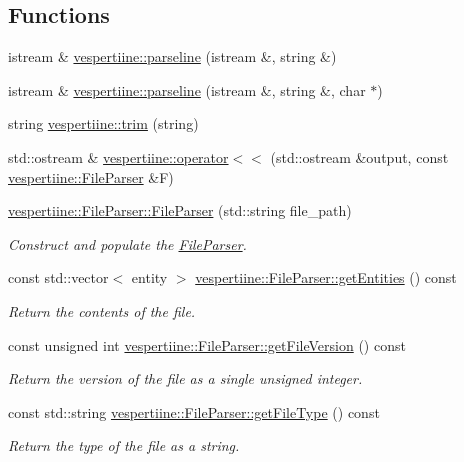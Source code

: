 \subsection*{Functions}
\begin{DoxyCompactItemize}
\item 
istream \& \hyperlink{group__vespertiine_ga45bab8eea6e760c36a785c145af6ba25}{vespertiine\+::parseline} (istream \&, string \&)
\item 
istream \& \hyperlink{group__vespertiine_ga05687b76bc32ebfb4d97d92c417acaf6}{vespertiine\+::parseline} (istream \&, string \&, char $\ast$)
\item 
string \hyperlink{group__vespertiine_ga5541b037e75ed830f526c2e073b26474}{vespertiine\+::trim} (string)
\item 
std\+::ostream \& \hyperlink{group__vespertiine_ga1ca507e4b8f52201ba9cccaaf496e9be}{vespertiine\+::operator$<$$<$} (std\+::ostream \&output, const \hyperlink{classvespertiine_1_1FileParser}{vespertiine\+::\+File\+Parser} \&F)
\item 
\hyperlink{group__vespertiine_ga01e372573c11d4c2848419c8842d583e}{vespertiine\+::\+File\+Parser\+::\+File\+Parser} (std\+::string file\+\_\+path)
\begin{DoxyCompactList}\small\item\em Construct and populate the \hyperlink{classvespertiine_1_1FileParser}{File\+Parser}. \end{DoxyCompactList}\item 
const std\+::vector$<$ entity $>$ \hyperlink{group__vespertiine_gac2360eb7febe37b75f13dc697a3d37ed}{vespertiine\+::\+File\+Parser\+::get\+Entities} () const 
\begin{DoxyCompactList}\small\item\em Return the contents of the file. \end{DoxyCompactList}\item 
const unsigned int \hyperlink{group__vespertiine_ga69070e93ff23a24380d0bad1c096205a}{vespertiine\+::\+File\+Parser\+::get\+File\+Version} () const 
\begin{DoxyCompactList}\small\item\em Return the version of the file as a single unsigned integer. \end{DoxyCompactList}\item 
const std\+::string \hyperlink{group__vespertiine_ga950b19f6ead99d8297e37eaeeed2fd3f}{vespertiine\+::\+File\+Parser\+::get\+File\+Type} () const 
\begin{DoxyCompactList}\small\item\em Return the type of the file as a string. \end{DoxyCompactList}\end{DoxyCompactItemize}

